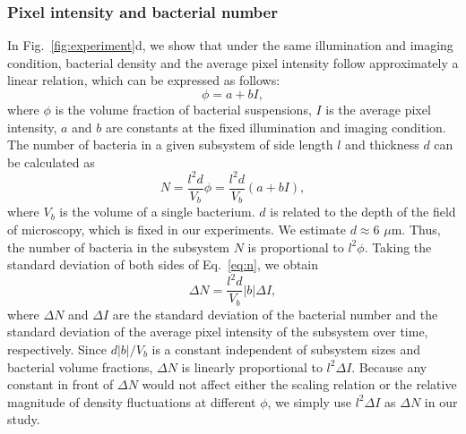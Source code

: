 \documentclass[twocolumn,aps,prx,amsmath,amssymb,longbibliography,superscriptaddress]{revtex4-2}
\begin{document}
\subsubsection{Pixel intensity and bacterial number}
In Fig.~\ref{fig:experiment}d, we show that under the same illumination and imaging condition, bacterial density and the average pixel intensity follow approximately a linear relation, which can be expressed as follows:
\begin{equation}
\label{eq:phi-I-relation}
\phi = a + bI,
\end{equation}
where $\phi$ is the volume fraction of bacterial suspensions, $I$ is the average pixel intensity, $a$ and $b$ are constants at the fixed illumination and imaging condition. The number of bacteria in a given subsystem of side length $l$ and thickness $d$ can be calculated as
\begin{equation}
\label{eq:n}
N = \frac{l^2d}{V_b} \phi = \frac{l^2d}{V_b} (a+bI),
\end{equation}
where $V_b$ is the volume of a single bacterium. $d$ is related to the depth of the field of microscopy, which is fixed in our experiments. We estimate $d \approx 6$ $\mu$m. Thus, the number of bacteria in the subsystem $N$ is proportional to $l^2 \phi$. Taking the standard deviation of both sides of Eq.~\ref{eq:n}, we obtain
\begin{equation}
\label{intensity-number}
\Delta N = \frac{l^2 d}{V_b}|b|\Delta I,
\end{equation}
where $\Delta N$ and $\Delta I$ are the standard deviation of the bacterial number and the standard deviation of the average pixel intensity of the subsystem over time, respectively. Since $d|b|/V_b$ is a constant independent of subsystem sizes and bacterial volume fractions, $\Delta N$ is linearly proportional to $l^2\Delta I$. Because any constant in front of $\Delta N$ would not affect either the scaling relation or the relative magnitude of density fluctuations at different $\phi$, we simply use $l^2\Delta I$ as $\Delta N$ in our study.

\end{document}
